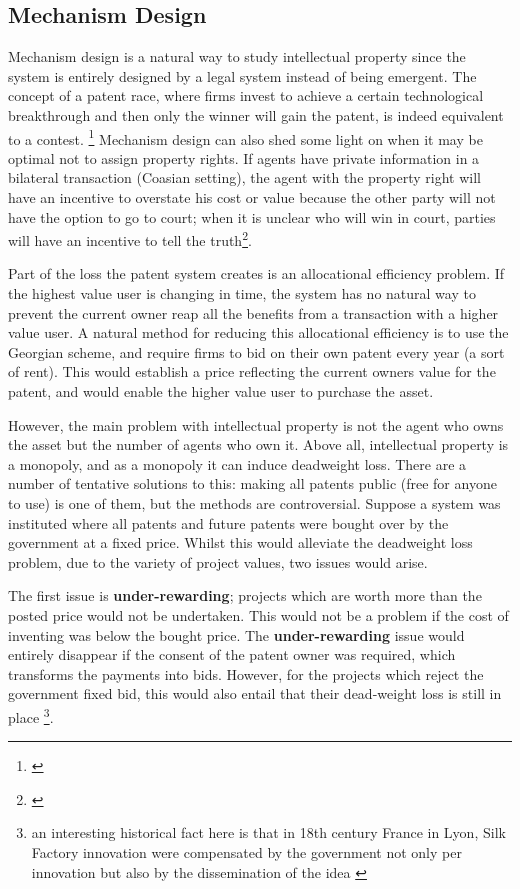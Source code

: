 \subsection{Mechanism Design}

Mechanism design is a natural way to study intellectual property since the system is entirely designed by a legal system instead of being emergent. The concept of a patent race, where firms invest to achieve a certain technological breakthrough and then only the winner will gain the patent, is indeed equivalent to a contest. \footnote{ \cite{Games2003} } Mechanism design can also shed some light on when it may be optimal not to assign property rights. If agents have private information in a bilateral transaction (Coasian setting), the agent with the property right will have an incentive to overstate his cost or value because the other party will not have the option to go to court; when it is unclear who will win in court, parties will have an incentive to tell the truth\footnote{\cite{schmitz2001coase}}.


Part of the loss the patent system creates is an allocational efficiency problem. If the highest value user is changing in time, the system has no natural way to prevent the current owner reap all the benefits from a transaction with a higher value user. A natural method for reducing this allocational efficiency is to use the Georgian scheme, and require firms to bid on their own patent every year (a sort of rent). This would establish a price reflecting the current owners value for the patent, and would enable the higher value user to purchase the asset. 

However, the main problem with intellectual property is not the agent who owns the asset but the number of agents who own it. Above all, intellectual property is a monopoly, and as a monopoly it can induce deadweight loss. There are a number of tentative solutions to this: making all patents public (free for anyone to use) is one of them, but the methods are controversial. Suppose a system was instituted where all patents and future patents were bought over by the government at a fixed price. Whilst this would alleviate the deadweight loss problem, due to the variety of project values, two issues would arise. 

The first issue is \textbf{under-rewarding}; projects which are worth more than the posted price would not be undertaken. This would not be a problem if the cost of inventing was below the bought price. The \textbf{under-rewarding} issue would entirely disappear if the consent of the patent owner was required, which transforms the payments into bids. However, for the projects which reject the government fixed bid, this would also entail that their dead-weight loss is still in place \footnote{an interesting historical fact here is that in 18th century France in Lyon, Silk Factory innovation were compensated by the government not only per innovation but also by the dissemination of the idea \cite{foray2013patent}}.


